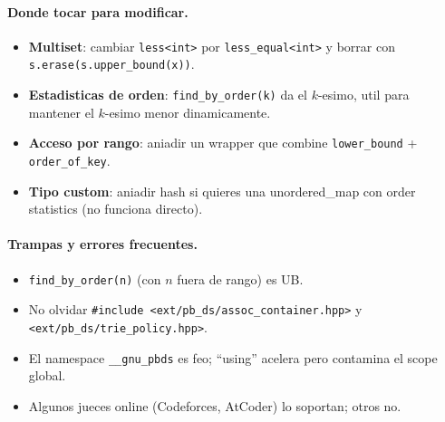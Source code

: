 \paragraph{Donde tocar para modificar.}
\begin{itemize}\setlength\itemsep{0pt}
	\item \textbf{Multiset}: cambiar \texttt{less<int>} por \texttt{less\_equal<int>} y borrar con \texttt{s.erase(s.upper\_bound(x))}.
	\item \textbf{Estadisticas de orden}: \texttt{find\_by\_order(k)} da el $k$-esimo, util para mantener el $k$-esimo menor dinamicamente.
	\item \textbf{Acceso por rango}: aniadir un wrapper que combine \texttt{lower\_bound} + \texttt{order\_of\_key}.
	\item \textbf{Tipo custom}: aniadir hash si quieres una unordered\_map con order statistics (no funciona directo).
\end{itemize}

\paragraph{Trampas y errores frecuentes.}
\begin{itemize}\setlength\itemsep{0pt}
	\item \texttt{find\_by\_order(n)} (con $n$ fuera de rango) es UB.
	\item No olvidar \texttt{\#include <ext/pb\_ds/assoc\_container.hpp>} y \texttt{<ext/pb\_ds/trie\_policy.hpp>}.
	\item El namespace \texttt{\_\_gnu\_pbds} es feo; ``using'' acelera pero contamina el scope global.
	\item Algunos jueces online (Codeforces, AtCoder) lo soportan; otros no.
\end{itemize}

